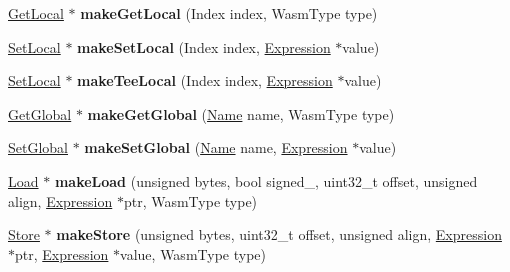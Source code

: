 \begin{DoxyCompactItemize}
\mbox{\label{classwasm_1_1_builder_a5d407f66a0865b4ac853525dde4f0671}} 
\mbox{\hyperlink{classwasm_1_1_get_local}{Get\+Local}} $\ast$ {\bfseries make\+Get\+Local} (Index index, Wasm\+Type type)
\item 
\mbox{\label{classwasm_1_1_builder_a1ce2f8a0b628b3acf3082426edf9c026}} 
\mbox{\hyperlink{classwasm_1_1_set_local}{Set\+Local}} $\ast$ {\bfseries make\+Set\+Local} (Index index, \mbox{\hyperlink{classwasm_1_1_expression}{Expression}} $\ast$value)
\item 
\mbox{\label{classwasm_1_1_builder_a9854b942664bef8d92b3f27098cd0a03}} 
\mbox{\hyperlink{classwasm_1_1_set_local}{Set\+Local}} $\ast$ {\bfseries make\+Tee\+Local} (Index index, \mbox{\hyperlink{classwasm_1_1_expression}{Expression}} $\ast$value)
\item 
\mbox{\label{classwasm_1_1_builder_a876aa112e358ce036eb7f4b46ad24d16}} 
\mbox{\hyperlink{classwasm_1_1_get_global}{Get\+Global}} $\ast$ {\bfseries make\+Get\+Global} (\mbox{\hyperlink{structwasm_1_1_name}{Name}} name, Wasm\+Type type)
\item 
\mbox{\label{classwasm_1_1_builder_a2f129b651e3b4d903efaf84ba7241e5e}} 
\mbox{\hyperlink{classwasm_1_1_set_global}{Set\+Global}} $\ast$ {\bfseries make\+Set\+Global} (\mbox{\hyperlink{structwasm_1_1_name}{Name}} name, \mbox{\hyperlink{classwasm_1_1_expression}{Expression}} $\ast$value)
\item 
\mbox{\label{classwasm_1_1_builder_a51f644293e2cc1ac4f8fbb8180e18bb4}} 
\mbox{\hyperlink{classwasm_1_1_load}{Load}} $\ast$ {\bfseries make\+Load} (unsigned bytes, bool signed\+\_\+, uint32\+\_\+t offset, unsigned align, \mbox{\hyperlink{classwasm_1_1_expression}{Expression}} $\ast$ptr, Wasm\+Type type)
\item 
\mbox{\label{classwasm_1_1_builder_a4fce65851f2f26c0918154619b36f710}} 
\mbox{\hyperlink{classwasm_1_1_store}{Store}} $\ast$ {\bfseries make\+Store} (unsigned bytes, uint32\+\_\+t offset, unsigned align, \mbox{\hyperlink{classwasm_1_1_expression}{Expression}} $\ast$ptr, \mbox{\hyperlink{classwasm_1_1_expression}{Expression}} $\ast$value, Wasm\+Type type)

\end{DoxyCompactItemize}
